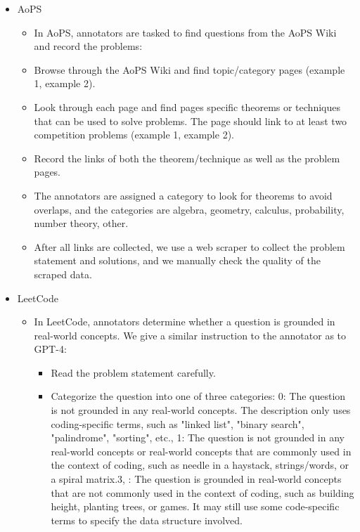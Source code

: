 \begin{itemize}
\begin{itemize}
\begin{itemize}
\begin{itemize}
                    \item If it is also consistent, mark the question as valid, and make any minor edits to the problem statement (e.g., to improve grammar or fluency) as you see fit.
                    \item If it is not solvable or not consistent, read the original question and solution, and correct the rewritten question if possible. If not, then discard the problem.
                \end{itemize}
            \end{itemize}
            \item AoPS
            \begin{itemize}
                \item In AoPS, annotators are tasked to find questions from the AoPS Wiki and record the problems:
                \item Browse through the AoPS Wiki and find topic/category pages (example 1, example 2).
                \item Look through each page and find pages specific theorems or techniques that can be used to solve problems. The page should link to at least two competition problems (example 1, example 2).
                \item Record the links of both the theorem/technique as well as the problem pages.
                \item The annotators are assigned a category to look for theorems to avoid overlaps, and the categories are {algebra, geometry, calculus, probability, number theory, other}.
                \item After all links are collected, we use a web scraper to collect the problem statement and solutions, and we manually check the quality of the scraped data.
            \end{itemize}
            \item LeetCode
            \begin{itemize}
                \item In LeetCode, annotators determine whether a question is grounded in real-world concepts. We give a similar instruction to the annotator as to GPT-4:
                \begin{itemize}
                    \item Read the problem statement carefully.
                    \item Categorize the question into one of three categories: 0: The question is not grounded in any real-world concepts. The description only uses coding-specific terms, such as "linked list", "binary search", "palindrome", "sorting", etc., 1: The question is not grounded in any real-world concepts or real-world concepts that are commonly used in the context of coding, such as needle in a haystack, strings/words, or a spiral matrix.3, : The question is grounded in real-world concepts that are not commonly used in the context of coding, such as building height, planting trees, or games. It may still use some code-specific terms to specify the data structure involved.

\end{itemize}
\end{itemize}
\end{itemize}
\end{itemize}
